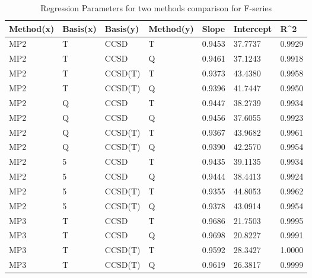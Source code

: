 \begin{table}
  \caption{Regression Parameters for two methods comparison for F-series}
  \label{tbl:regression-two-f}
  \begin{tabular}{l l l l l l l }
    \hline
    Method(x) & Basis(x) & Basis(y) & Method(y) & Slope & Intercept & R^2 \\ 
    \hline
    MP2 & T & CCSD & T & 0.9453 & 37.7737 & 0.9929 \\ 
    MP2 & T & CCSD & Q & 0.9461 & 37.1243 & 0.9918 \\ 
    MP2 & T & CCSD(T) & T & 0.9373 & 43.4380 & 0.9958 \\ 
    MP2 & T & CCSD(T) & Q & 0.9396 & 41.7447 & 0.9950 \\ 
    MP2 & Q & CCSD & T & 0.9447 & 38.2739 & 0.9934 \\ 
    MP2 & Q & CCSD & Q & 0.9456 & 37.6055 & 0.9923 \\ 
    MP2 & Q & CCSD(T) & T & 0.9367 & 43.9682 & 0.9961 \\ 
    MP2 & Q & CCSD(T) & Q & 0.9390 & 42.2570 & 0.9954 \\ 
    MP2 & 5 & CCSD & T & 0.9435 & 39.1135 & 0.9934 \\ 
    MP2 & 5 & CCSD & Q & 0.9444 & 38.4413 & 0.9924 \\ 
    MP2 & 5 & CCSD(T) & T & 0.9355 & 44.8053 & 0.9962 \\ 
    MP2 & 5 & CCSD(T) & Q & 0.9378 & 43.0914 & 0.9954 \\ 
    MP3 & T & CCSD & T & 0.9686 & 21.7503 & 0.9995 \\ 
    MP3 & T & CCSD & Q & 0.9698 & 20.8227 & 0.9991 \\ 
    MP3 & T & CCSD(T) & T & 0.9592 & 28.3427 & 1.0000 \\ 
    MP3 & T & CCSD(T) & Q & 0.9619 & 26.3817 & 0.9999 \\ 
    \hline
  \end{tabular}
\end{table}
